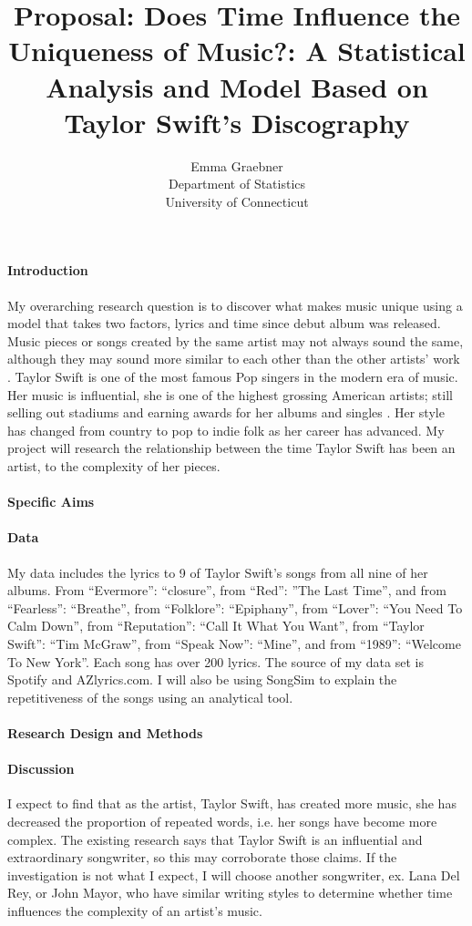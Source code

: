 \documentclass[12pt]{article}
\title{Proposal: Does Time Influence the Uniqueness of Music?: A Statistical Analysis and Model Based on Taylor Swift's Discography}
\author{Emma Graebner\\
  Department of Statistics\\
  University of Connecticut
}
\begin{document}
\maketitle


\paragraph{Introduction}
My overarching research question is to discover what makes music unique using a model that takes two factors, lyrics and time since debut album was released. Music pieces or songs created by the same artist may not always sound the same, although they may sound more similar to each other than the other artists' work \cite{chuan2013multimodal}. Taylor Swift is one of the most famous Pop singers in the modern era of music. Her music is influential, she is one of the highest grossing American artists; still selling out stadiums and earning awards for her albums and singles \citep{fogarty2021you} . Her style has changed from country to pop to indie folk as her career has advanced. My project will research the relationship between the time Taylor Swift has been an artist, to the complexity of her pieces. \citep{sloan2021taylor} 


\citep{perone2017words}

\paragraph{Specific Aims}


\paragraph{Data}
My data includes the lyrics to 9 of Taylor Swift’s songs from all nine of her albums. From “Evermore”: “closure”, from “Red”: ”The Last Time”, and from “Fearless”: “Breathe”, from “Folklore”: “Epiphany”, from “Lover”: “You Need To Calm Down”, from “Reputation”: “Call It What You Want”, from “Taylor Swift”: “Tim McGraw”, from “Speak Now”: “Mine”, and from “1989”: “Welcome To New York”. Each song has over 200 lyrics. The source of my data set is Spotify and AZlyrics.com. I will also be using SongSim to explain the repetitiveness of the songs using an analytical tool.
\paragraph{Research Design and Methods}


\paragraph{Discussion}
I expect to find that as the artist, Taylor Swift, has created more music, she has decreased the proportion of repeated words, i.e. her songs have become more complex. The existing research says that Taylor Swift is an influential and extraordinary songwriter, so this may corroborate those claims. If the investigation is not what I expect, I will choose another songwriter, ex. Lana Del Rey, or John Mayor, who have similar writing styles to determine whether time influences the complexity of an artist’s music. 
\end{document}
